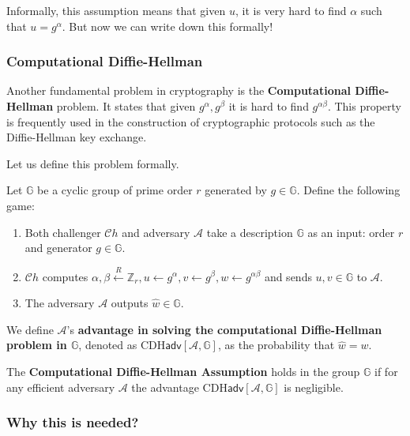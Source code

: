 \documentclass[../lecture-notes.tex]{subfiles}
\begin{document}
Informally, this assumption means that given $u$, it is very hard to find $\alpha$ such that $u = g^{\alpha}$. But now we can write down this formally!

\subsubsection{Computational Diffie-Hellman}

Another fundamental problem in cryptography is the \textbf{Computational Diffie-Hellman} problem. It states that given $g^{\alpha},g^{\beta}$ it is hard to find $g^{\alpha\beta}$. This property is frequently used in the construction of cryptographic protocols such as the Diffie-Hellman key exchange.

Let us define this problem formally.

\begin{definition}
    Let $\mathbb{G}$ be a cyclic group of prime order $r$ generated by $g \in \mathbb{G}$. Define the following game:
    \begin{enumerate}
        \item Both challenger $\mathcal{C}h$ and adversary $\mathcal{A}$ take a description $\mathbb{G}$ as an input: order $r$ and generator $g \in \mathbb{G}$.
        \item $\mathcal{C}h$ computes $\alpha, \beta \xleftarrow{R} \mathbb{Z}_r, u \gets g^{\alpha}, v \gets g^{\beta}, w \gets g^{\alpha\beta}$ and sends $u,v \in \mathbb{G}$ to $\mathcal{A}$.
        \item The adversary $\mathcal{A}$ outputs $\hat{w} \in \mathbb{G}$.
    \end{enumerate}

    We define $\mathcal{A}$'s \textbf{advantage in solving the computational Diffie-Hellman problem in $\mathbb{G}$}, denoted as $\text{CDH}\mathsf{adv}[\mathcal{A},\mathbb{G}]$, as the probability that $\hat{w} = w$.
\end{definition}

\begin{definition}
    The \textbf{Computational Diffie-Hellman Assumption} holds in the group $\mathbb{G}$ if for any efficient adversary $\mathcal{A}$ the advantage $\text{CDH}\mathsf{adv}[\mathcal{A},\mathbb{G}]$ is negligible.
\end{definition}

\subsubsection{Why this is needed?}
\end{document}

